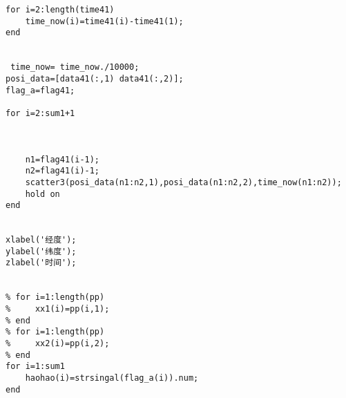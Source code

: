 \begin{appendix}
\begin{lstlisting}[caption=synthesize.m]
for i=2:length(time41)
    time_now(i)=time41(i)-time41(1);
end

        
 time_now= time_now./10000;
posi_data=[data41(:,1) data41(:,2)];
flag_a=flag41;

for i=2:sum1+1

    

    n1=flag41(i-1);
    n2=flag41(i)-1;
    scatter3(posi_data(n1:n2,1),posi_data(n1:n2,2),time_now(n1:n2));
    hold on
end


xlabel('经度');
ylabel('纬度');
zlabel('时间');


% for i=1:length(pp)
%     xx1(i)=pp(i,1);
% end
% for i=1:length(pp)
%     xx2(i)=pp(i,2);
% end
for i=1:sum1
    haohao(i)=strsingal(flag_a(i)).num;
end
	\end{lstlisting}
\end{appendix}
